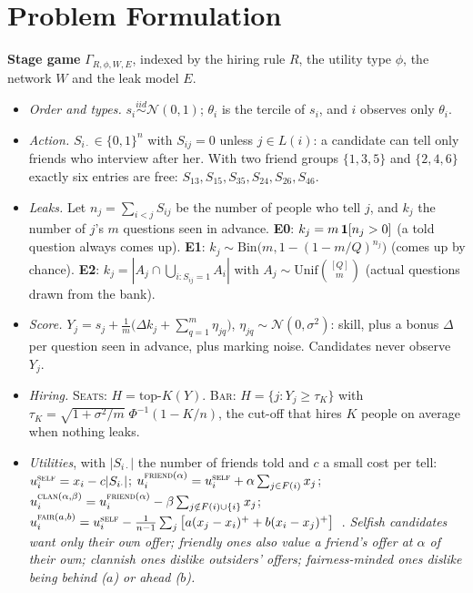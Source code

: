 \documentclass[10pt]{article}
\theoremstyle{plain}
\theoremstyle{definition}\newtheorem{definition}{Definition}
\newcommand{\seats}{\textsc{Seats}}\newcommand{\barr}{\textsc{Bar}}
\newcommand{\plain}[1]{\emph{#1}}
\begin{document}
\section{Problem Formulation}
\textbf{Stage game} $\Gamma_{R,\phi,W,E}$, indexed by the hiring rule $R$, the utility type $\phi$, the network $W$ and the leak model $E$.
\begin{itemize}
\item \emph{Order and types.} $s_i\overset{iid}{\sim}\mathcal N(0,1)$; $\theta_i$ is the tercile of $s_i$, and $i$ observes only $\theta_i$.
\item \emph{Action.} $S_{i\cdot}\in\{0,1\}^n$ with $S_{ij}=0$ unless $j\in L(i)$: a candidate can tell only friends who interview after her.
With two friend groups $\{1,3,5\}$ and $\{2,4,6\}$ exactly six entries are free: $S_{13},S_{15},S_{35},S_{24},S_{26},S_{46}$.
\item \emph{Leaks.} Let $n_j=\sum_{i<j}S_{ij}$ be the number of people who tell $j$, and $k_j$ the number of $j$'s $m$ questions seen in advance.
\textbf{E0}: $k_j=m\,\mathbf{1}[n_j>0]$ (a told question always comes up).
\textbf{E1}: $k_j\sim\mathrm{Bin}\!\big(m,1-(1-m/Q)^{n_j}\big)$ (comes up by chance).
\textbf{E2}: $k_j=|A_j\cap\bigcup_{i:S_{ij}=1}A_i|$ with $A_j\sim\mathrm{Unif}\binom{[Q]}{m}$ (actual questions drawn from the bank).
\item \emph{Score.} $Y_j=s_j+\frac1m\big(\Delta k_j+\sum_{q=1}^m\eta_{jq}\big)$, $\eta_{jq}\sim\mathcal N(0,\sigma^2)$: skill, plus a bonus
$\Delta$ per question seen in advance, plus marking noise. Candidates never observe $Y_j$.
\item \emph{Hiring.} \seats: $H=\text{top-}K(Y)$. \barr: $H=\{j:Y_j\ge\tau_K\}$ with $\tau_K=\sqrt{1+\sigma^2/m}\;\Phi^{-1}(1-K/n)$, the
cut-off that hires $K$ people on average when nothing leaks.
\item \emph{Utilities}, with $|S_{i\cdot}|$ the number of friends told and $c$ a small cost per tell:
$u_i^{\textsc{self}}=x_i-c|S_{i\cdot}|$;\;
$u_i^{\textsc{friend}(\alpha)}=u_i^{\textsc{self}}+\alpha\sum_{j\in F(i)}x_j$;\;
$u_i^{\textsc{clan}(\alpha,\beta)}=u_i^{\textsc{friend}(\alpha)}-\beta\sum_{j\notin F(i)\cup\{i\}}x_j$;\;
$u_i^{\textsc{fair}(a,b)}=u_i^{\textsc{self}}-\frac{1}{n-1}\sum_j\big[a(x_j-x_i)^++b(x_i-x_j)^+\big]$~\cite{fehr}.
\plain{Selfish candidates want only their own offer; friendly ones also value a friend's offer at $\alpha$ of their own; clannish ones
dislike outsiders' offers; fairness-minded ones dislike being behind ($a$) or ahead ($b$).}
\end{itemize}
\end{document}
